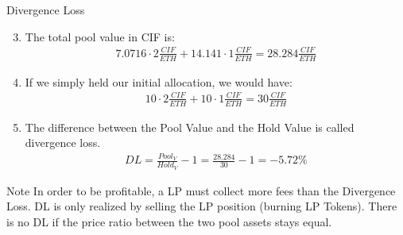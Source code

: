 \documentclass[]{beamer}
\begin{document}
\begin{frame}{Divergence Loss}
	\begin{enumerate}
	\setcounter{enumi}{2}
		\item The total pool value in CIF is: 
			\begin{align*}
				7.0716 \cdot 2 \tfrac{CIF}{ETH} + 14.141 \cdot 1 \tfrac{CIF}{ETH} = 28.284 \tfrac{CIF}{ETH}
			\end{align*}
		\item If we simply held our initial allocation, we would have:
			\begin{align*}
			10 \cdot 2 \tfrac{CIF}{ETH} + 10 \cdot 1 \tfrac{CIF}{ETH} = 	30 \tfrac{CIF}{ETH}
			\end{align*}
		\item The difference between the Pool Value and the Hold Value is called divergence loss.
		\begin{align*}
			DL = \tfrac{Pool_V}{Hold_V} -1 = \tfrac{28.284}{30} - 1 = -5.72 \%
			\end{align*}
	\end{enumerate}	
\begin{keytakeaway}{Note}
	In order to be profitable, a LP must collect more fees than the Divergence Loss. DL is only realized by selling the LP position (burning LP Tokens). There is no DL if the price ratio between the two pool assets stays equal.
\end{keytakeaway}

\end{frame}
\end{document}
